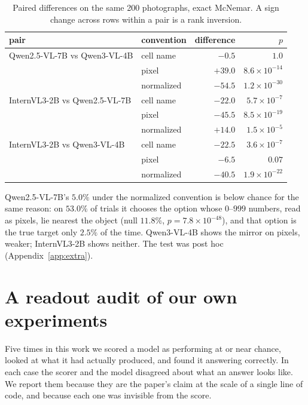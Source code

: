 \documentclass{article}
\begin{document}
\begin{table}[t]
\centering
\caption{Paired differences on the same 200 photographs, exact McNemar. A sign
change across rows within a pair is a rank inversion.}
\label{tab:inversion}
\begin{tabular}{llrr}
\toprule
pair & convention & difference & $p$ \\
\midrule
Qwen2.5-VL-7B vs Qwen3-VL-4B & cell name   & $-0.5$  & $1.0$ \\
                             & pixel       & $+39.0$ & $8.6\times10^{-14}$ \\
                             & normalized  & $-54.5$ & $1.2\times10^{-30}$ \\
\midrule
InternVL3-2B vs Qwen2.5-VL-7B & cell name  & $-22.0$ & $5.7\times10^{-7}$ \\
                              & pixel      & $-45.5$ & $8.5\times10^{-19}$ \\
                              & normalized & $+14.0$ & $1.5\times10^{-5}$ \\
\midrule
InternVL3-2B vs Qwen3-VL-4B  & cell name   & $-22.5$ & $3.6\times10^{-7}$ \\
                             & pixel       & $-6.5$  & $0.07$ \\
                             & normalized  & $-40.5$ & $1.9\times10^{-22}$ \\
\bottomrule
\end{tabular}
\end{table}

Qwen2.5-VL-7B's $5.0\%$ under the normalized convention is below chance for the
same reason: on $53.0\%$ of trials it chooses the option whose $0$--$999$ numbers,
read as pixels, lie nearest the object (null $11.8\%$, $p=7.8\times10^{-48}$), and
that option is the true target only $2.5\%$ of the time. Qwen3-VL-4B shows the
mirror on pixels, weaker; InternVL3-2B shows neither. The test was post hoc
(Appendix~\ref{app:extra}).

\section{A readout audit of our own experiments}
\label{sec:audit}

Five times in this work we scored a model as performing at or near chance, looked
at what it had actually produced, and found it answering correctly. In each case
the scorer and the model disagreed about what an answer looks like. We report
them because they are the paper's claim at the scale of a single line of code,
and because each one was invisible from the score.
\end{document}
